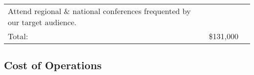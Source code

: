 \documentclass[10pt,openany]{book}
\begin{document}
\begin{longtable}[]{@{}lrl@{}}
\begin{minipage}[t]{0.48\columnwidth}
Attend regional \& national conferences frequented by our target
audience.\strut
\end{minipage}\tabularnewline
\begin{minipage}[t]{0.32\columnwidth}\raggedright
Total:\strut
\end{minipage} & \begin{minipage}[t]{0.11\columnwidth}\raggedleft
\$131,000\strut
\end{minipage} & \begin{minipage}[t]{0.48\columnwidth}\raggedright
\strut
\end{minipage}\tabularnewline
\bottomrule
\end{longtable}

\hypertarget{cost-of-operations}{%
\subsection{Cost of Operations}\label{cost-of-operations}}
\end{document}
